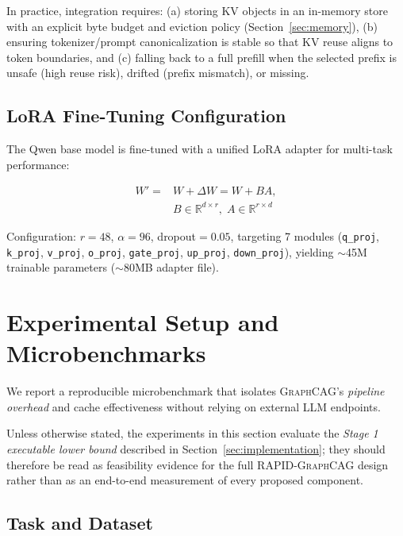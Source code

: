 \documentclass[11pt,a4paper,twocolumn]{article}
\newcommand{\graphcag}{\textsc{GraphCAG}}
\newcommand{\rapid}{\textsc{RAPID-GraphCAG}}
\begin{document}
In practice, integration requires: (a) storing KV objects in an in-memory store with an explicit byte budget and eviction policy (Section~\ref{sec:memory}), (b) ensuring tokenizer/prompt canonicalization is stable so that KV reuse aligns to token boundaries, and (c) falling back to a full prefill when the selected prefix is unsafe (high reuse risk), drifted (prefix mismatch), or missing.

\subsection{LoRA Fine-Tuning Configuration}

The Qwen base model is fine-tuned with a unified LoRA adapter for multi-task performance:

\begin{equation}
\begin{aligned}
W' ={}& W + \Delta W = W + BA, \\
& B \in \mathbb{R}^{d \times r},\; A \in \mathbb{R}^{r \times d}
\end{aligned}
\end{equation}

\noindent Configuration: $r=48$, $\alpha=96$, dropout$=0.05$, targeting 7 modules (\texttt{q\_proj}, \texttt{k\_proj}, \texttt{v\_proj}, \texttt{o\_proj}, \texttt{gate\_proj}, \texttt{up\_proj}, \texttt{down\_proj}), yielding $\sim$45M trainable parameters ($\sim$80MB adapter file).

\section{Experimental Setup and Microbenchmarks}
\label{sec:experiments}

We report a reproducible microbenchmark that isolates \graphcag{}'s \emph{pipeline overhead} and cache effectiveness without relying on external LLM endpoints.

Unless otherwise stated, the experiments in this section evaluate the \emph{Stage 1 executable lower bound} described in Section~\ref{sec:implementation}; they should therefore be read as feasibility evidence for the full \rapid{} design rather than as an end-to-end measurement of every proposed component.

\subsection{Task and Dataset}
\end{document}

